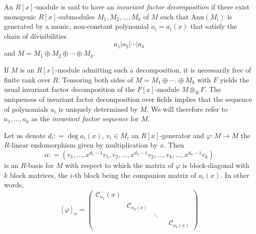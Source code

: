 \begin{definition} An $ R[x]$-module is  said to have an \textit{invariant factor decomposition} if there exist monogenic $ R[x]$-submodules   $ M_{1} ,  M_{2} ,  \ldots,  M_{k}   $ of $ M  $  such that  $ \mathrm{Ann}(M_{i}) $ is generated by a monic, non-constant polynomial $  a_{i} = a_{i}(x) $ that satisfy the chain of divisibilities $$  a_{1} |  a_{2}  |            \cdots  |  a_{k}       $$            
and  $  M    =   M_{1}     \oplus   M_{2}   \oplus    \cdots   \oplus      M_{k}            $. 
\end{definition} 

If  $ M $ is an $R[x]$-module admitting such a decomposition, it is necessarily free of finite rank over $ R $.   Tensoring  both  sides       of     $ M = M_{1} \oplus  \cdots. \oplus   M_{k} $ with $ F $ yields the usual invariant factor decomposition of the $ F[x] $-module $ M \otimes_{R} F $. The uniqueness of invariant factor decomposition over fields implies that the sequence  of   polynomials $ a_{i}  $ is uniquely determined by $ M  $. We will therefore  refer to $ a_{1}, \ldots, a_{k} $ as  the \emph{invariant factor sequence}  for $ M $.  
 
Let us denote  $    d_{i}  : =     \deg   a_{i}(x)  $, $ v_{i} \in M_i$ an $ R[x]$-generator and $ \varphi : M \to M $ the $ R $-linear endomorphism given by multiplication by $ x $. Then $$           \alpha            : =   ( v_{1} ,  \ldots,  x ^ { d_{1}    - 1 } v_{1} ,  v_{2}  , \ldots,   x ^{ d_{2} - 1}  v_{2} ,  \ldots ,   v_{k}  , \ldots ,         x ^ { d_{k} -1 } v_{k}  )   $$ is an $ R $-basis for $  M  $ with respect to which the matrix of $ \varphi $ is block-diagonal with $ k $ block matrices, the $  i $-th block being the companion matrix of $ a_{i}(x) $. In other words,                                                                   
\begin{equation} \label{xalpha}    [\varphi]_{\alpha}  = \begin{pmatrix}    \mathcal{C}_{a_{1}}(x)  &   &    &    \\ 
                                                                            &    \mathcal{C}_{a_{2}(x)} &    &      &       \\ 
                                                                                                                          &    &    \ddots    &  &      \\
                                                             &                       &                                      &  &        \mathcal{C}_{a_{k}(x)}      
\end{pmatrix} 
\end{equation}  


